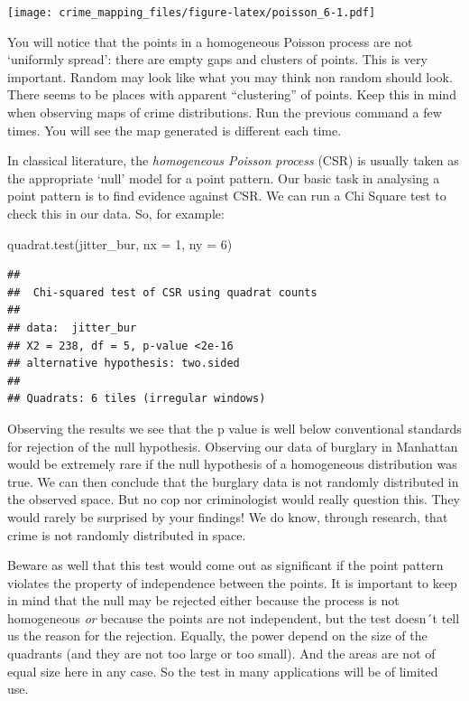 \documentclass[
  krantz2]{krantz}
\makeatletter
\newenvironment{Shaded}{\begin{snugshade}}{\end{snugshade}}
\newcommand{\AttributeTok}[1]{\textcolor[rgb]{0.61,0.61,0.61}{#1}}
\newcommand{\DecValTok}[1]{\textcolor[rgb]{0.06,0.06,0.06}{#1}}
\newcommand{\FunctionTok}[1]{\textcolor[rgb]{0,0,0}{#1}}
\newcommand{\NormalTok}[1]{#1}
\newenvironment{kframe}{%
\medskip{}
\setlength{\fboxsep}{.8em}
 \def\at@end@of@kframe{}%
 \ifinner\ifhmode%
  \def\at@end@of@kframe{\end{minipage}}%
  \begin{minipage}{\columnwidth}%
 \fi\fi%
 \def\FrameCommand##1{\hskip\@totalleftmargin \hskip-\fboxsep
 \colorbox{shadecolor}{##1}\hskip-\fboxsep
     \hskip-\linewidth \hskip-\@totalleftmargin \hskip\columnwidth}%
 \MakeFramed {\advance\hsize-\width
   \@totalleftmargin\z@ \linewidth\hsize
   \@setminipage}}%
 {\par\unskip\endMakeFramed%
 \at@end@of@kframe}
\renewenvironment{Shaded}{\begin{kframe}}{\end{kframe}}
\makeatother
\begin{document}
\texttt{[image: crime\_mapping\_files/figure-latex/poisson\_6-1.pdf]}

You will notice that the points in a homogeneous Poisson process are not `uniformly spread': there are empty gaps and clusters of points. This is very important. Random may look like what you may think non random should look. There seems to be places with apparent ``clustering'' of points. Keep this in mind when observing maps of crime distributions. Run the previous command a few times. You will see the map generated is different each time.

In classical literature, the \emph{homogeneous Poisson process} (CSR) is usually taken as the appropriate `null' model for a point pattern. Our basic task in analysing a point pattern is to find evidence against CSR. We can run a Chi Square test to check this in our data. So, for example:

\begin{Shaded}
\begin{Highlighting}[]
\FunctionTok{quadrat.test}\NormalTok{(jitter\_bur, }\AttributeTok{nx =} \DecValTok{1}\NormalTok{, }\AttributeTok{ny =} \DecValTok{6}\NormalTok{)}
\end{Highlighting}
\end{Shaded}

\begin{verbatim}
## 
##  Chi-squared test of CSR using quadrat counts
## 
## data:  jitter_bur
## X2 = 238, df = 5, p-value <2e-16
## alternative hypothesis: two.sided
## 
## Quadrats: 6 tiles (irregular windows)
\end{verbatim}

Observing the results we see that the p value is well below conventional standards for rejection of the null hypothesis. Observing our data of burglary in Manhattan would be extremely rare if the null hypothesis of a homogeneous distribution was true. We can then conclude that the burglary data is not randomly distributed in the observed space. But no cop nor criminologist would really question this. They would rarely be surprised by your findings! We do know, through research, that crime is not randomly distributed in space.

Beware as well that this test would come out as significant if the point pattern violates the property of independence between the points. It is important to keep in mind that the null may be rejected either because the process is not homogeneous \emph{or} because the points are not independent, but the test doesn´t tell us the reason for the rejection. Equally, the power depend on the size of the quadrants (and they are not too large or too small). And the areas are not of equal size here in any case. So the test in many applications will be of limited use.
\end{document}
